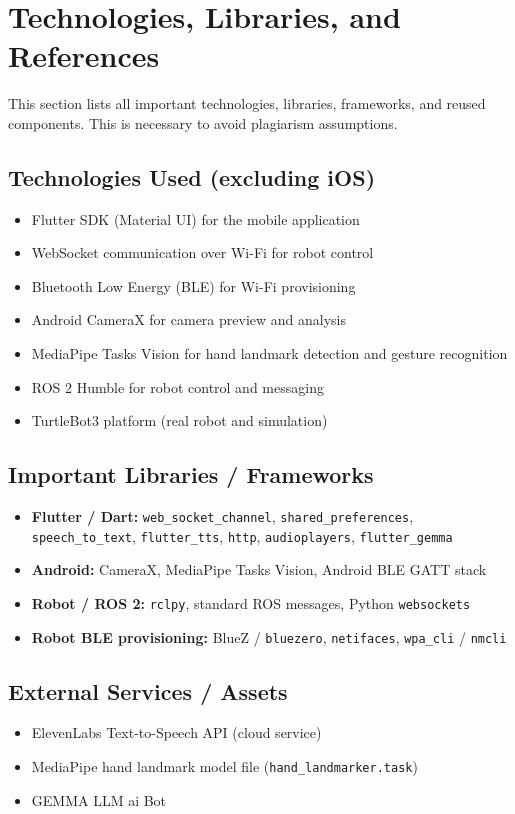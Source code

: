 \documentclass[11pt,a4paper]{article}
\begin{document}
\newpage
\section{Technologies, Libraries, and References}

This section lists all important technologies, libraries, frameworks, and reused components.
This is necessary to avoid plagiarism assumptions.

\subsection{Technologies Used (excluding iOS)}
\begin{itemize}[leftmargin=1.5cm]
	\item Flutter SDK (Material UI) for the mobile application
	\item WebSocket communication over Wi-Fi for robot control
	\item Bluetooth Low Energy (BLE) for Wi-Fi provisioning
	\item Android CameraX for camera preview and analysis
	\item MediaPipe Tasks Vision for hand landmark detection and gesture recognition
	\item ROS 2 Humble for robot control and messaging
	\item TurtleBot3 platform (real robot and simulation)
\end{itemize}

\subsection{Important Libraries / Frameworks}
\begin{itemize}[leftmargin=1.5cm]
	\item \textbf{Flutter / Dart:} \texttt{web\_socket\_channel}, \texttt{shared\_preferences}, \texttt{speech\_to\_text},
	\texttt{flutter\_tts}, \texttt{http}, \texttt{audioplayers}, \texttt{flutter\_gemma}
	\item \textbf{Android:} CameraX, MediaPipe Tasks Vision, Android BLE GATT stack
	\item \textbf{Robot / ROS 2:} \texttt{rclpy}, standard ROS messages, Python \texttt{websockets}
	\item \textbf{Robot BLE provisioning:} BlueZ / \texttt{bluezero}, \texttt{netifaces}, \texttt{wpa\_cli} / \texttt{nmcli}
\end{itemize}

\subsection{External Services / Assets}
\begin{itemize}[leftmargin=1.5cm]
	\item ElevenLabs Text-to-Speech API (cloud service)
	\item MediaPipe hand landmark model file (\texttt{hand\_landmarker.task})
	\item GEMMA LLM ai Bot
\end{itemize}
\end{document}

